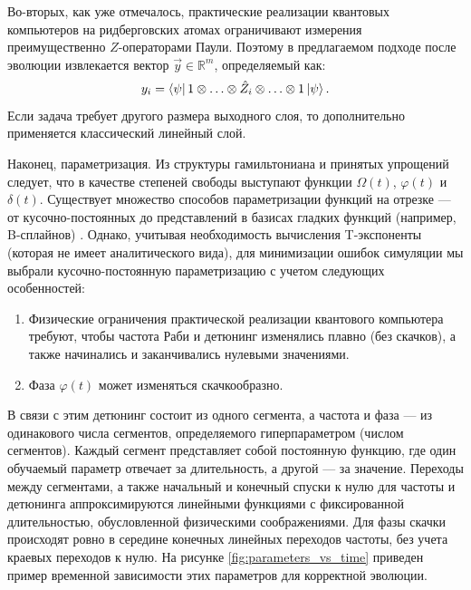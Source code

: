 Во-вторых, как уже отмечалось, практические реализации квантовых компьютеров на ридберговских атомах ограничивают измерения преимущественно $Z$-операторами Паули. Поэтому в предлагаемом подходе после эволюции извлекается вектор $\vec{y} \in \mathbb{R}^m$, определяемый как:
\begin{equation}
    y_i = \bra{\psi} 1 \otimes \ldots\otimes \hat{Z}_i \otimes \ldots \otimes 1 \ket{\psi}.
\end{equation}
Если задача требует другого размера выходного слоя, то дополнительно применяется классический линейный слой.

Наконец, параметризация. Из структуры гамильтониана и принятых упрощений следует, что в качестве степеней свободы выступают функции $\Omega(t)$, $\varphi(t)$ и $\delta(t)$. Существует множество способов параметризации функций на отрезке --- от кусочно-постоянных \cite{khaneja2005grape} до представлений в базисах гладких функций (например, B-сплайнов) \cite{petersson2021bsplines}. Однако, учитывая необходимость вычисления T-экспоненты (которая не имеет аналитического вида), для минимизации ошибок симуляции мы выбрали кусочно-постоянную параметризацию с учетом следующих особенностей:
\begin{enumerate}
\item Физические ограничения практической реализации квантового компьютера требуют, чтобы частота Раби и детюнинг изменялись плавно (без скачков), а также начинались и заканчивались нулевыми значениями.
\item Фаза $\varphi(t)$ может изменяться скачкообразно.
\end{enumerate}
В связи с этим детюнинг состоит из одного сегмента, а частота и фаза --- из одинакового числа сегментов, определяемого гиперпараметром (числом сегментов). Каждый сегмент представляет собой постоянную функцию, где один обучаемый параметр отвечает за длительность, а другой --- за значение. Переходы между сегментами, а также начальный и конечный спуски к нулю для частоты и детюнинга аппроксимируются линейными функциями с фиксированной длительностью, обусловленной физическими соображениями. Для фазы скачки происходят ровно в середине конечных линейных переходов частоты, без учета краевых переходов к нулю. На рисунке \ref{fig:parameters_vs_time} приведен пример временной зависимости этих параметров для корректной эволюции.

